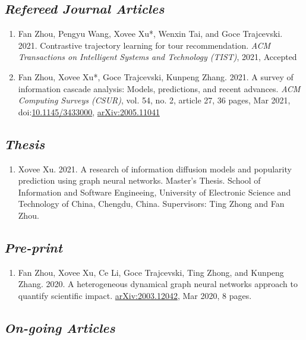 \subsection*{\textnormal{\textit{Refereed Journal Articles}}}

\begin{enumerate}[resume]
    \item Fan Zhou, Pengyu Wang, Xovee Xu*, Wenxin Tai, and Goce Trajcevski. 2021. Contrastive trajectory learning for tour recommendation. \textit{ACM Transactions on Intelligent Systems and Technology (TIST)}, 2021, Accepted
    \item Fan Zhou, Xovee Xu*, Goce Trajcevski, Kunpeng Zhang. 2021. A survey of information cascade analysis: Models, predictions, and recent advances. \textit{ACM Computing Surveys (CSUR)}, vol. 54, no. 2, article 27, 36 pages, Mar 2021, doi:\href{https://xovee.cn/html/paper-redirects/csur2021.html}{10.1145/3433000}, \href{https://arxiv.org/abs/2005.11041}{arXiv:2005.11041}
\end{enumerate}

\subsection*{\textnormal{\textit{Thesis}}}

\begin{enumerate}[resume]
    \item Xovee Xu. 2021. A research of information diffusion models and popularity prediction using graph neural networks. Master's Thesis. School of Information and Software Engineeing, University of Electronic Science and Technology of China, Chengdu, China. Supervisors: Ting Zhong and Fan Zhou. 
\end{enumerate}

\subsection*{\textnormal{\textit{Pre-print}}}

\begin{enumerate}[resume]
    \item Fan Zhou, Xovee Xu, Ce Li, Goce Trajcevski, Ting Zhong, and Kunpeng Zhang. 2020. A heterogeneous dynamical graph neural networks approach to quantify scientific impact. \href{https://arxiv.org/abs/2003.12042}{arXiv:2003.12042}, Mar 2020, 8 pages. 
\end{enumerate}

\subsection*{\textnormal{\textit{On-going Articles}}}


